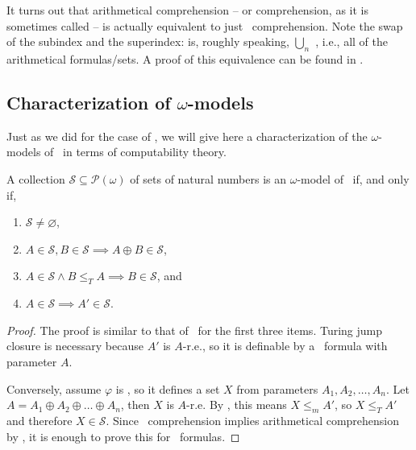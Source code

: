 \documentclass[../main.tex]{memoir}
\begin{document}
\begin{remark}
  \label{remark:aca-re-comprehension}
  It turns out that arithmetical comprehension -- or  comprehension, as it is sometimes called -- is actually equivalent to just \re\ comprehension. Note the swap of the subindex and the superindex:  is, roughly speaking, $\bigcup_{n}$ , i.e., all of the arithmetical formulas/sets. A proof of this equivalence can be found in \cite{simpson}.
\end{remark}

\subsection{Characterization of $\omega$-models}

Just as we did for the case of \rca, we will give here a characterization of the $\omega$-models of \aca\ in terms of computability theory.

\begin{theorem}
  A collection $\mathcal{S} \subseteq \mathcal{P}(\omega)$ of sets of natural numbers is an $\omega$-model of \aca\ if, and only if,

  \begin{enumerate}[label=(\roman*), ref=(\roman*)]
  \item $\mathcal{S} \neq \varnothing$,
  \item \label{item:join-closure-aca} $A \in \mathcal{S}, B \in \mathcal{S} \implies A \oplus B \in \mathcal{S}$,
  \item $A \in \mathcal{S} \land B \le_T A \implies B \in \mathcal{S}$, and
  \item $A \in \mathcal{S} \implies A' \in \mathcal{S}$.
  \end{enumerate}
\end{theorem}
\begin{proof}
  The proof is similar to that of \rca\ for the first three items. Turing jump closure is necessary because $A'$ is $A$-r.e., so it is definable by a \re\ formula with parameter $A$.

  Conversely, assume $\varphi$ is \re, so it defines a set $X$ from parameters $A_1, A_2, \ldots, A_n$. Let $A = A_1 \oplus A_2 \oplus \ldots \oplus A_n$, then $X$ is $A$-r.e. By , this means $X \le_m A'$, so $X \le_T A'$ and therefore $X \in \mathcal{S}$. Since \re\ comprehension implies arithmetical comprehension by , it is enough to prove this for \re\ formulas.
\end{proof}
\end{document}
